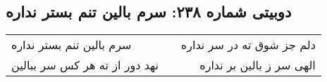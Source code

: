 \begin{center}
\section*{دوبیتی شماره ۲۳۸: سرم بالین تنم بستر نداره}
\label{sec:238}
\begin{longtable}{l p{0.5cm} r}
سرم بالین تنم بستر نداره
&&
دلم جز شوق ته در سر نداره
\\
نهد دور از ته هر کس سر ببالین
&&
الهی سر ز بالین بر نداره
\\
\end{longtable}
\end{center}
